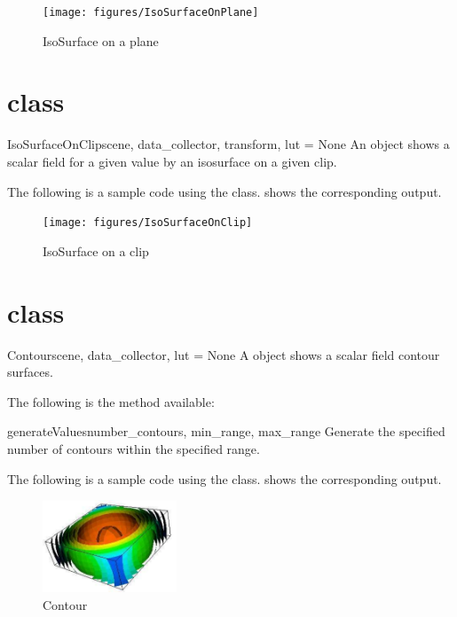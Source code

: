 \begin{figure}[ht]
\begin{center}
\texttt{[image: figures/IsoSurfaceOnPlane]}
\end{center}
\caption{IsoSurface on a plane}
\label{fig:isosurfaceonplane.1}
\end{figure}

\section{\IsoSurfaceOnClip class}
\begin{classdesc}{IsoSurfaceOnClip}{scene, data_collector, transform, 
lut = None}
An \IsoSurfaceOnClip object shows a scalar field for a given value 
by an isosurface on a given clip.
\end{classdesc}

The following is a sample code using the \IsoSurfaceOnClip class.
 shows the corresponding output.


\begin{figure}[ht]
\begin{center}
\texttt{[image: figures/IsoSurfaceOnClip]}
\end{center}
\caption{IsoSurface on a clip}
\label{fig:isosurfaceonclip.1}
\end{figure}

\section{\Contour class}
\begin{classdesc}{Contour}{scene, data_collector, lut = None}
A \Contour object shows a scalar field contour surfaces.
\end{classdesc}

The following is the method available:
\begin{methoddesc}[Contour]{generateValues}{number_contours, min_range,
max_range}
Generate the specified number of contours within the specified range.
\end{methoddesc}

The following is a sample code using the \Contour class.
 shows the corresponding output.


\begin{figure}[ht]
\begin{center}
\includegraphics[width=40mm]{figures/Contour}
\end{center}
\caption{Contour}
\label{fig:contour.1}
\end{figure}

